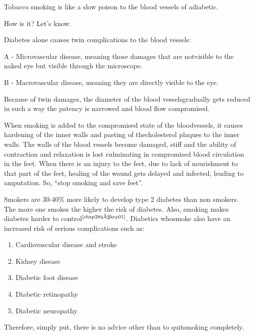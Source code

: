 Tobacco smoking is like a slow poison to the blood vessels of a\break diabetic.

How is it? Let’s know.

Diabetes alone causes twin complications to the blood vessels:

A - Microvascular disease, meaning those damages that are not\break visible to the naked eye but visible through the microscope.

B - Macrovascular disease, meaning they are directly visible to the eye.

Because of twin damages, the diameter of the blood vessels\break gradually gets reduced in such a way the patency is narrowed and blood flow compromised.

When smoking is added to the compromised state of the blood\break vessels, it causes hardening of the inner walls and pasting of the\break cholesterol plaques to the inner walls. The walls of the blood vessels become damaged, stiff and the ability of contraction and relaxation is lost culminating in compromised blood circulation in the feet. When there is an injury to the feet, due to lack of nourishment to that part of the feet, healing of the wound gets delayed and infected, leading to amputation. So, “stop smoking and save feet”.

Smokers are 30-40\% more likely to develop type 2 diabetes than non smokers. The more one smokes the higher the risk of diabetes.  Also, smoking makes diabetes harder to control$^{\text{\cite{chap28–key01}}}$. Diabetics who\break smoke also have an increased risk of serious complications such as:

\vspace{-\topsep}
\begin{enumerate}[•]
\itemsep=0pt
\item Cardiovascular disease and stroke
\item Kidney disease
\item Diabetic foot disease
\item Diabetic retinopathy
\item Diabetic neuropathy
\end{enumerate}
\vspace{-\topsep}

Therefore, simply put, there is no advice other than to quit\break smoking completely.

